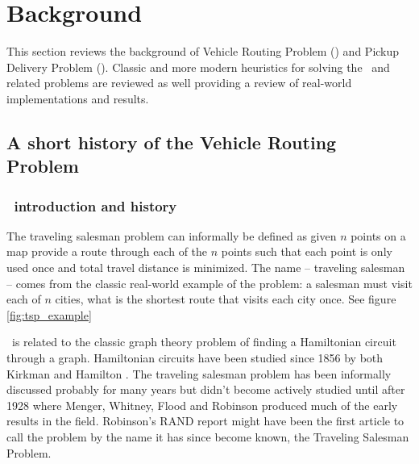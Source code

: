 
\chapter{Background}
This section reviews the background of Vehicle Routing Problem (\VRP) and Pickup Delivery Problem (\PDP). Classic and more modern heuristics for solving the \VRP\ and related problems are reviewed as well providing a review of real-world implementations and results. 

\section{A short history of the Vehicle Routing Problem}

\subsection{\TSP\ introduction and history}
The traveling salesman problem can informally be defined as given $n$ points on a map provide a route through each of the $n$ points such that each point is only used once and total travel distance is minimized. The name -- traveling salesman -- comes from the classic real-world example of the problem: a salesman must visit each of $n$ cities, what is the shortest route that visits each city once. See figure \ref{fig:tsp_example}



\TSP\ is related to the classic graph theory problem of finding a Hamiltonian circuit through a graph. Hamiltonian circuits have been studied since 1856 by both Kirkman \cite{Kirkman:1856} and Hamilton \cite{Hamilton:1856}. The traveling salesman problem has been informally discussed probably for many years \cite{Schrijver} but didn't become actively studied until after 1928 where Menger, Whitney, Flood and Robinson produced much of the early results in the field. Robinson's RAND report \cite{Robinson:1949} might have been the first article to call the problem by the name it has since become known, the Traveling Salesman Problem.  


